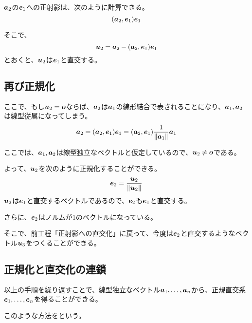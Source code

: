 \documentclass[../../../topic_linear-algebra]{subfiles}
\begin{document}
\br

$\vb*{a}_2$の$\vb*{e}_1$への正射影は、次のように計算できる。
\begin{equation*}
  (\vb*{a}_2, \vb*{e}_1) \vb*{e}_1
\end{equation*}

そこで、
\begin{equation*}
  \vb*{u}_2 = \vb*{a}_2 - (\vb*{a}_2, \vb*{e}_1) \vb*{e}_1
\end{equation*}
とおくと、$\vb*{u}_2$は$\vb*{e}_1$と直交する。

\subsection{再び正規化}

ここで、もし$\vb*{u}_2 = \vb*{o}$ならば、$\vb*{a}_2$は$\vb*{a}_1$の線形結合で表されることになり、$\vb*{a}_1, \vb*{a}_2$は線型従属になってしまう。
\begin{equation*}
  \vb*{a}_2 = (\vb*{a}_2, \vb*{e}_1) \vb*{e}_1 = (\vb*{a}_2, \vb*{e}_1) \frac{1}{\|\vb*{a}_1\|} \vb*{a}_1
\end{equation*}

ここでは、$\vb*{a}_1, \vb*{a}_2$は線型独立なベクトルと仮定しているので、$\vb*{u}_2 \neq \vb*{o}$である。

\br

よって、$\vb*{u}_2$を次のように正規化することができる。
\begin{equation*}
  \vb*{e}_2 = \frac{\vb*{u}_2}{\|\vb*{u}_2\|}
\end{equation*}
$\vb*{u}_2$は$\vb*{e}_1$と直交するベクトルであるので、$\vb*{e}_2$も$\vb*{e}_1$と直交する。

さらに、$\vb*{e}_2$はノルムが1のベクトルになっている。

\br

そこで、前工程「正射影への直交化」に戻って、今度は$\vb*{e}_2$と直交するようなベクトル$\vb*{u}_3$をつくることができる。

\subsection{正規化と直交化の連鎖}

以上の手順を繰り返すことで、線型独立なベクトル$\vb*{a}_1, \ldots, \vb*{a}_n$から、正規直交系$\vb*{e}_1, \ldots, \vb*{e}_n$を得ることができる。

\br

このような方法をという。
\end{document}
